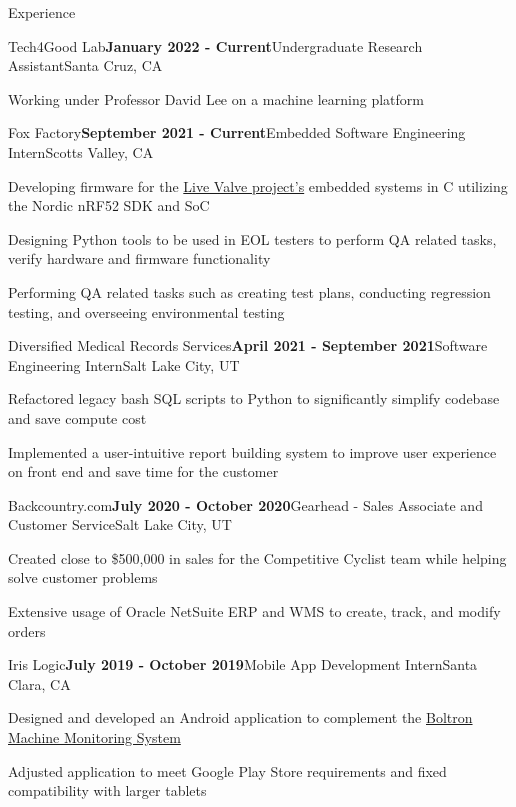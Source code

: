 \documentclass{resume}
\begin{document}
\begin{rSection}{\large Experience}


\begin{rSubsection}{Tech4Good Lab}{\bf{January 2022 - Current}}{Undergraduate Research Assistant}{Santa Cruz, CA }
\item Working under Professor David Lee on a machine learning platform  
\end{rSubsection}

\begin{rSubsection}{Fox Factory}{\bf{September 2021 - Current}}{Embedded Software Engineering Intern}{Scotts Valley, CA }
\item Developing firmware for the \href{https://www.pinkbike.com/news/fox-updates-live-valve-electonic-suspension-for-2022.html}{Live Valve project's} embedded systems in C utilizing the Nordic nRF52 SDK and SoC
\item Designing Python tools to be used in EOL testers to perform QA related tasks, verify hardware and firmware functionality
\item Performing QA related tasks such as creating test plans, conducting regression testing, and overseeing environmental testing
\end{rSubsection}

\begin{rSubsection}{Diversified Medical Records Services}{\bf{April 2021 - September 2021}}{Software Engineering Intern}{Salt Lake City, UT }
\item Refactored legacy bash SQL scripts to Python to significantly simplify codebase and save compute cost
\item Implemented a user-intuitive report building system to improve user experience on front end and save time for the customer
\end{rSubsection}

\begin{rSubsection}{Backcountry.com}{\bf{July 2020 - October 2020}}{Gearhead - Sales Associate and Customer Service}{Salt Lake City, UT }
\item Created close to \$500,000 in sales for the Competitive Cyclist team while helping solve customer problems
\item Extensive usage of Oracle NetSuite ERP and WMS to create, track, and modify orders
\end{rSubsection}

\begin{rSubsection}{Iris Logic}{\bf{July 2019 - October 2019}}{Mobile App Development Intern}{Santa Clara, CA }
\item Designed and developed an Android application to complement the \href{https://irislogic.com/boltron-machine-monitoring-system/}{Boltron Machine Monitoring System}
\item Adjusted application to meet Google Play Store requirements and fixed compatibility with larger tablets
\end{rSubsection}

\end{rSection}
\end{document}

